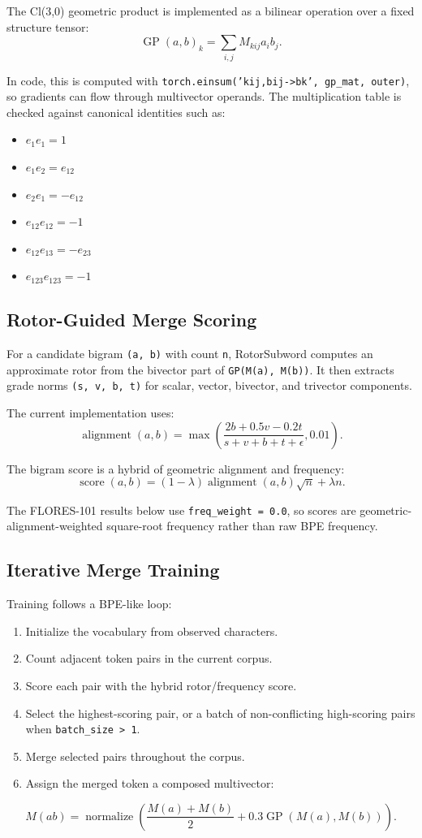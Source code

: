 \documentclass[11pt]{article}
\begin{document}
The Cl(3,0) geometric product is implemented as a bilinear operation over a fixed structure tensor:
\[
\operatorname{GP}(a, b)_k = \sum_{i,j} M_{kij} a_i b_j.
\]

In code, this is computed with \texttt{torch.einsum('kij,bij->bk', gp\_mat, outer)}, so gradients can flow through multivector operands. The multiplication table is checked against canonical identities such as:
\begin{itemize}
  \item $e_1e_1 = 1$
  \item $e_1e_2 = e_{12}$
  \item $e_2e_1 = -e_{12}$
  \item $e_{12}e_{12} = -1$
  \item $e_{12}e_{13} = -e_{23}$
  \item $e_{123}e_{123} = -1$
\end{itemize}

\subsection{Rotor-Guided Merge Scoring}

For a candidate bigram \texttt{(a, b)} with count \texttt{n}, RotorSubword computes an approximate rotor from the bivector part of \texttt{GP(M(a), M(b))}. It then extracts grade norms \texttt{(s, v, b, t)} for scalar, vector, bivector, and trivector components.

The current implementation uses:
\[
\operatorname{alignment}(a,b) =
\max\left(\frac{2b + 0.5v - 0.2t}{s + v + b + t + \epsilon}, 0.01\right).
\]

The bigram score is a hybrid of geometric alignment and frequency:
\[
\operatorname{score}(a,b) =
(1 - \lambda)\operatorname{alignment}(a,b)\sqrt{n} + \lambda n.
\]

The FLORES-101 results below use \texttt{freq\_weight = 0.0}, so scores are geometric-alignment-weighted square-root frequency rather than raw BPE frequency.

\subsection{Iterative Merge Training}

Training follows a BPE-like loop:
\begin{enumerate}
  \item Initialize the vocabulary from observed characters.
  \item Count adjacent token pairs in the current corpus.
  \item Score each pair with the hybrid rotor/frequency score.
  \item Select the highest-scoring pair, or a batch of non-conflicting high-scoring pairs when \texttt{batch\_size > 1}.
  \item Merge selected pairs throughout the corpus.
  \item Assign the merged token a composed multivector:
\end{enumerate}
\[
M(ab) = \operatorname{normalize}\left(\frac{M(a) + M(b)}{2} + 0.3 \operatorname{GP}(M(a), M(b))\right).
\]
\end{document}
